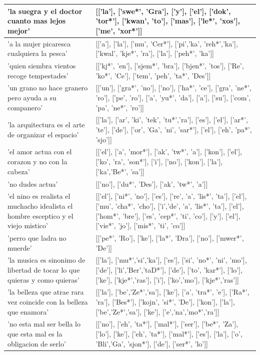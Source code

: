 \documentclass[11pt,a4paper,twoside]{tesis}
\begin{document}
\begin{longtable}{| p{} | p{} |}
'la suegra y el doctor cuanto mas lejos mejor' & [['la'], ['swe*', 'Gra'], ['y'], ['el'], ['dok', 'tor*'], ['kwan', 'to'], ['mas'], ['le*', 'xos'], ['me', 'xor*']] \\ \hline
'a la mujer picaresca cualquiera la pesca' & [['a'], ['la'], ['mu', 'Cer*'], ['pi','ka', 'reh*','ka'], ['kwal', 'kje*', 'ra'], ['la'], ['peh*', 'ka']] \\ \hline
'quien siembra vientos recoge tempestades' & [['kj*', 'en'], ['sjem*', 'bra'], ['bjen*', 'tos'], ['Re', 'ko*', 'Ce'], ['tem', 'peh', 'ta*', 'Des']] \\ \hline
'un grano no hace granero pero ayuda a su companero' & [['un'], ['gra*', 'no'], ['no'], ['ha*', 'ce'], ['gra', 'ne*', 'ro'], ['pe', 'ro'], ['a', 'yu*', 'da'], ['a'], ['su'], ['com', 'pa', 'ne*', 'ro']] \\ \hline
'la arquitectura es el arte de organizar el espacio' & [['la'], ['ar', 'ki', 'tek', 'tu*','ra'], ['es'], ['el'], ['ar*', 'te'], ['de'], ['or', 'Ga', 'ni', 'sar*'], ['el'], ['eh', 'pa*', 'sjo']] \\ \hline
'el amor actua con el corazon y no con la cabeza' & [['el'], ['a', 'mor*'], ['ak', 'tw*', 'a'], ['kon'], ['el'], ['ko', 'ra', 'son*'], ['i'], ['no'], ['kon'], ['la'], ['ka','Be*', 'sa']] \\ \hline
'no dudes actua' & [['no'], ['du*', 'Des'], ['ak', 'tw*', 'a']] \\ \hline
'el nino es realista el muchacho idealista el hombre esceptico y el viejo mistico' & [['el'], ['ni*', 'no'], ['es'], ['re', 'a', 'lis*', 'ta'], ['el'], ['mu', 'cha*', 'cho'], ['i','de', 'a', 'lis*', 'ta'], ['el'], ['hom*', 'bre'], ['es', 'cep*', 'ti', 'co'], ['y'], ['el'], ['vie*', 'jo'], ['mis*', 'ti', 'co']] \\ \hline
'perro que ladra no muerde' & [['pe*', 'Ro'], ['ke'], ['la*', 'Dra'], ['no'], ['mwer*', 'De']] \\ \hline
'la musica es sinonimo de libertad de tocar lo que quieras y como quieras' & [['la'], ['mu*','si','ka'], ['es'], ['si', 'no*', 'ni', 'mo'], ['de'], ['li','Ber','taD*'], ['de'], ['to', 'kar*'], ['lo'], ['ke'], ['kje*','ras'], ['i'], ['ko','mo'], ['kje*','ras']] \\ \hline
'la belleza que atrae rara vez coincide con la belleza que enamora' & [['la'], ['be','Ze*','sa'], ['ke'], ['a', 'tra*', 'e'], ['Ra*', 'ra'], ['Bes*'], ['kojn', 'si*', 'De'], ['kon'], ['la'], ['be','Ze*','sa'], ['ke'], ['e','na','mo*','ra']] \\ \hline
'no esta mal ser bella lo que esta mal es la obligacion de serlo' & [['no'], ['eh', 'ta*'], ['mal*'], ['ser'], ['be*', 'Za'], ['lo'], ['ke'], ['eh', 'ta*'], ['mal*'], ['es'], ['la'], ['o', 'Bli','Ga', 'sjon*'], ['de'], ['ser*', 'lo']] \\ \hline

\end{longtable}
\end{document}

